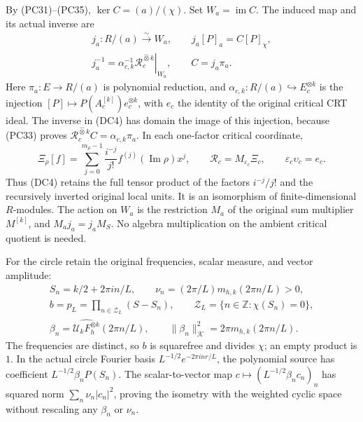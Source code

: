 By (PC31)--(PC35), $\ker C=(a)/(\chi)$.  Set $W_a=\operatorname{im}C$.
The induced map and its actual inverse are
\[
 \begin{gathered}
 j_a:R/(a)\xrightarrow{\sim}W_a,\qquad
 j_a[P]_a=C[P]_\chi,\\
 j_a^{-1}
 =\alpha_{c,k}^{-1}
   \left.\mathcal R_c^{\widehat\otimes k}\right|_{W_a},
 \qquad C=j_a\pi_a .
 \end{gathered}
 \tag{DC4}
\]
Here $\pi_a:E\to R/(a)$ is polynomial reduction, and
$\alpha_{c,k}:R/(a)\hookrightarrow E_c^{\otimes k}$ is the injection
$[P]\mapsto P(A_c^{[k]})e_c^{\otimes k}$, with $e_c$ the identity of
the original critical CRT ideal.  The inverse in (DC4) has domain the
image of this injection, because (PC33) proves
$\mathcal R_c^{\widehat\otimes k}C=\alpha_{c,k}\pi_a$.
In each one-factor critical coordinate,
\[
 \Xi_\rho[f]=
 \sum_{j=0}^{m_\rho-1}\frac{i^{-j}}{j!}f^{(j)}(\operatorname{Im}\rho)x^j,
 \qquad
 \mathcal R_c=M_{\varepsilon_c}\Xi_c,\qquad
 \varepsilon_c\upsilon_c=e_c .
 \tag{DC5}
\]
Thus (DC4) retains the full tensor product of the factors
$i^{-j}/j!$ and the recursively inverted original local units.
It is an isomorphism of finite-dimensional $R$-modules.  The action on
$W_a$ is the restriction $M_a$ of the original sum multiplier
$M^{[k]}$, and $M_a j_a=j_a M_S$.  No algebra multiplication on the
ambient critical quotient is needed.

For the circle retain the original frequencies, scalar measure, and
vector amplitude:
\[
 \begin{gathered}
 S_n=k/2+2\pi i n/L,\qquad
 \nu_n=(2\pi/L)m_{h,k}(2\pi n/L)>0,\\
 b=p_L=\prod_{n\in\mathcal Z_L}(S-S_n),\qquad
 \mathcal Z_L=\{n\in\mathbb Z:\chi(S_n)=0\},\\
 \beta_n=\widehat{\mathcal U_kF_h^{\otimes k}}(2\pi n/L),
 \qquad \|\beta_n\|_{\mathcal K}^2=2\pi m_{h,k}(2\pi n/L).
 \end{gathered}
 \tag{DC6}
\]
The frequencies are distinct, so $b$ is squarefree and divides
$\chi$; an empty product is $1$.
In the actual circle Fourier basis
$L^{-1/2}e^{-2\pi i nr/L}$, the polynomial source has coefficient
$L^{-1/2}\beta_nP(S_n)$.
The scalar-to-vector map
$c\mapsto(L^{-1/2}\beta_nc_n)_n$ has squared norm
$\sum_n\nu_n|c_n|^2$, proving the isometry with the weighted cyclic
space without rescaling any $\beta_n$ or $\nu_n$.


